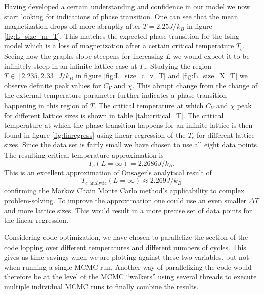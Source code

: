 \documentclass[english,notitlepage,reprint,nofootinbib]{revtex4-1}  %
\begin{document}
Having developed a certain understanding and confidence in our model we now start looking for indications of phase transition. One can see that the mean magnetization drops off more abruptly after $T=2.25 J/k_B$ in figure \ref{fig:L_size_m_T}. This matches the expected phase transition for the Ising model which is a loss of magnetization after a certain critical temperature $T_c$. Seeing how the graphs slope steepens for increasing $L$ we would expect it to be infinitely steep in an infinite lattice case at $T_c$. Studying the region $T \in [2.235,2.33]J/k_B$ in figure \ref{fig:L_size_c_v_T} and \ref{fig:L_size_X_T} we observe definite peak values for $C_V$ and $\chi$. This abrupt change from the change of the external temperature parameter further indicates a phase transition happening in this region of $T$. The critical temperature at which $C_V$ and $\chi$ peak for different lattice sizes is shown in table \ref{tab:critical_T}. The critical temperature at which the phase transition happens for an infinite lattice is then found in figure \ref{fig:linregress} using linear regression of the $T_c$ for different lattice sizes. Since the data set is fairly small we have chosen to use all eight data points. The resulting critical temperature approximation is
\begin{equation}
    T_c(L=\infty) = 2.2686 J/k_B.
\end{equation}
This is an excellent approximation of Onsager's analytical result of
\begin{equation}
    T_{c \text{ analytic}}(L=\infty) \approx 2.269 J/k_B
\end{equation}
confirming the Markov Chain Monte Carlo method's applicability to complex problem-solving. To improve the approximation one could use an even smaller $\Delta T$ and more lattice sizes. This would result in a more precise set of data points for the linear regression.

Considering code optimization, we have chosen to parallelize the section of the code lopping over different temperatures and different numbers of cycles. This gives us time savings when we are plotting against these two variables, but not when running a single MCMC run. Another way of parallelizing the code would therefore be at the level of the MCMC ``walkers'' using several threads to execute multiple individual MCMC runs to finally combine the results.

\end{document}
